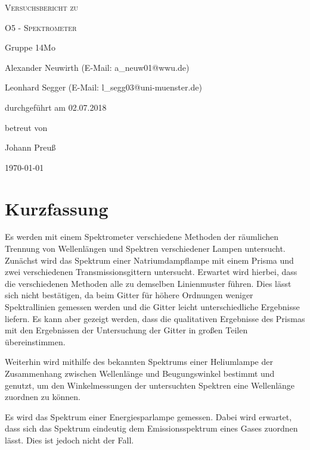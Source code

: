 \documentclass[
	a4paper,
	12pt,
	pagesize,
	ngerman
]{scrartcl}
\begin{document}
	
	\begin{titlepage}
		\centering
		{\scshape\LARGE Versuchsbericht zu \par}
		\vspace{1cm}
		{\scshape\huge O5 - Spektrometer \par}
		\vspace{2.5cm}
		{\LARGE Gruppe 14Mo \par}
		\vspace{0.5cm}
		
		{\large Alexander Neuwirth (E-Mail: a\_neuw01@wwu.de) \par}
		{\large Leonhard Segger (E-Mail: l\_segg03@uni-muenster.de) \par}
		\vfill
		
		durchgeführt am 02.07.2018\par
		betreut von\par
		{\large Johann Preuß} 
		
		\vfill
		
		{\large \today\par}
	\end{titlepage}
	\tableofcontents
	\newpage

	\section{Kurzfassung}
	Es werden mit einem Spektrometer verschiedene Methoden der räumlichen Trennung von Wellenlängen und Spektren verschiedener Lampen untersucht.
	Zunächst wird das Spektrum einer Natriumdampflampe mit einem Prisma und zwei verschiedenen Transmissionsgittern untersucht.
	Erwartet wird hierbei, dass die verschiedenen Methoden alle zu demselben Linienmuster führen.
	Dies lässt sich nicht bestätigen, da beim Gitter für höhere Ordnungen weniger Spektrallinien gemessen werden und die Gitter leicht unterschiedliche Ergebnisse liefern.
	Es kann aber gezeigt werden, dass die qualitativen Ergebnisse des Prismas  mit den Ergebnissen der Untersuchung der Gitter in großen Teilen übereinstimmen.
	
	Weiterhin wird mithilfe des bekannten Spektrums einer Heliumlampe der Zusammenhang zwischen Wellenlänge und Beugungswinkel bestimmt und genutzt, um den Winkelmessungen der untersuchten Spektren eine Wellenlänge zuordnen zu können.
	
	Es wird das Spektrum einer Energiesparlampe gemessen.
	Dabei wird erwartet, dass sich das Spektrum eindeutig dem Emissionsspektrum eines Gases zuordnen lässt.
	Dies ist jedoch nicht der Fall.
	
\end{document}

